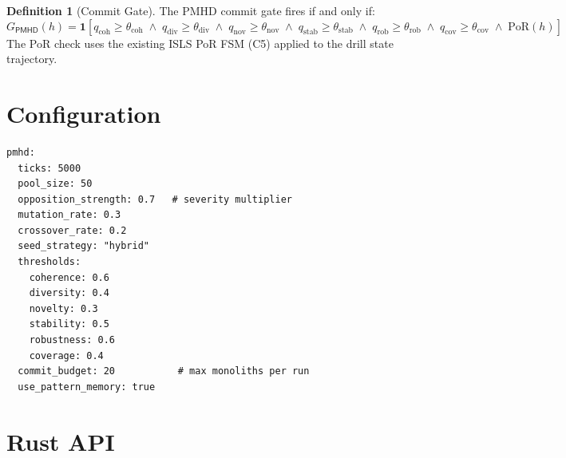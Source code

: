 \documentclass[11pt,a4paper,twoside]{article}
\theoremstyle{definition}
\newtheorem{definition}{Definition}[section]
\theoremstyle{plain}
\theoremstyle{remark}
\newcommand{\ISLS}{\textsf{ISLS}}
\newcommand{\PMHD}{\textsf{PMHD}}
\begin{document}
\begin{definition}[Commit Gate]\label{def:commitgate}
The PMHD commit gate fires if and only if:
\[
  G_{\PMHD}(h) = \mathbf{1}\!\left[
    q_{\mathrm{coh}} \ge \theta_{\mathrm{coh}} \;\wedge\;
    q_{\mathrm{div}} \ge \theta_{\mathrm{div}} \;\wedge\;
    q_{\mathrm{nov}} \ge \theta_{\mathrm{nov}} \;\wedge\;
    q_{\mathrm{stab}} \ge \theta_{\mathrm{stab}} \;\wedge\;
    q_{\mathrm{rob}} \ge \theta_{\mathrm{rob}} \;\wedge\;
    q_{\mathrm{cov}} \ge \theta_{\mathrm{cov}} \;\wedge\;
    \mathrm{PoR}(h)
  \right]
\]
The PoR check uses the existing \ISLS{} PoR FSM (C5) applied to the
drill state trajectory.
\end{definition}


\section{Configuration}\label{sec:pmhd:config}

\begin{lstlisting}[title={PMHD Configuration}]
pmhd:
  ticks: 5000
  pool_size: 50
  opposition_strength: 0.7   # severity multiplier
  mutation_rate: 0.3
  crossover_rate: 0.2
  seed_strategy: "hybrid"
  thresholds:
    coherence: 0.6
    diversity: 0.4
    novelty: 0.3
    stability: 0.5
    robustness: 0.6
    coverage: 0.4
  commit_budget: 20           # max monoliths per run
  use_pattern_memory: true
\end{lstlisting}


\section{Rust API}\label{sec:pmhd:api}
\end{document}
